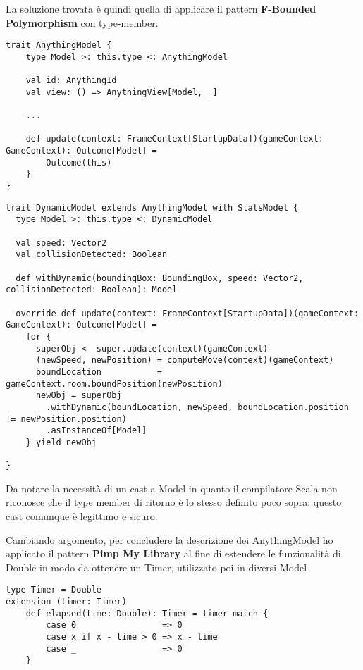 La soluzione trovata è quindi quella di applicare il pattern \textbf{F-Bounded Polymorphism} con type-member.

\begin{lstlisting}[basicstyle=\tiny]
trait AnythingModel {
    type Model >: this.type <: AnythingModel
    
    val id: AnythingId
    val view: () => AnythingView[Model, _]

    ...

    def update(context: FrameContext[StartupData])(gameContext: GameContext): Outcome[Model] =
        Outcome(this)
    }
}  
\end{lstlisting}

\begin{lstlisting}[basicstyle=\tiny]
trait DynamicModel extends AnythingModel with StatsModel {
  type Model >: this.type <: DynamicModel

  val speed: Vector2
  val collisionDetected: Boolean

  def withDynamic(boundingBox: BoundingBox, speed: Vector2, collisionDetected: Boolean): Model

  override def update(context: FrameContext[StartupData])(gameContext: GameContext): Outcome[Model] =
    for {
      superObj <- super.update(context)(gameContext)
      (newSpeed, newPosition) = computeMove(context)(gameContext)
      boundLocation           = gameContext.room.boundPosition(newPosition)
      newObj = superObj
        .withDynamic(boundLocation, newSpeed, boundLocation.position != newPosition.position)
        .asInstanceOf[Model]
    } yield newObj

} 
\end{lstlisting}

Da notare la necessità di un cast a Model in quanto il compilatore Scala non riconosce che il type member di ritorno è lo stesso definito poco sopra: questo cast comunque è legittimo e sicuro. 

Cambiando argomento, per concludere la descrizione dei AnythingModel ho applicato il pattern \textbf{Pimp My Library} al fine di estendere le funzionalità di Double in modo da ottenere un Timer, utilizzato poi in diversi Model 
\begin{lstlisting}[basicstyle=\tiny]
type Timer = Double
extension (timer: Timer)
    def elapsed(time: Double): Timer = timer match {
        case 0                 => 0
        case x if x - time > 0 => x - time
        case _                 => 0
    }
\end{lstlisting}

